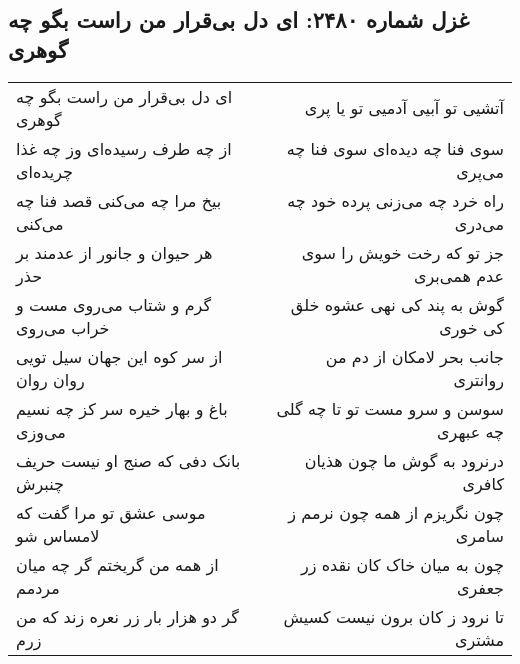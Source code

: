 \begin{center}
\section*{غزل شماره ۲۴۸۰: ای دل بی‌قرار من راست بگو چه گوهری}
\label{sec:2480}
\begin{longtable}{l p{0.5cm} r}
ای دل بی‌قرار من راست بگو چه گوهری
&&
آتشیی تو آبیی آدمیی تو یا پری
\\
از چه طرف رسیده‌ای وز چه غذا چریده‌ای
&&
سوی فنا چه دیده‌ای سوی فنا چه می‌پری
\\
بیخ مرا چه می‌کنی قصد فنا چه می‌کنی
&&
راه خرد چه می‌زنی پرده خود چه می‌دری
\\
هر حیوان و جانور از عدمند بر حذر
&&
جز تو که رخت خویش را سوی عدم همی‌بری
\\
گرم و شتاب می‌روی مست و خراب می‌روی
&&
گوش به پند کی نهی عشوه خلق کی خوری
\\
از سر کوه این جهان سیل تویی روان روان
&&
جانب بحر لامکان از دم من روانتری
\\
باغ و بهار خیره سر کز چه نسیم می‌وزی
&&
سوسن و سرو مست تو تا چه گلی چه عبهری
\\
بانک دفی که صنج او نیست حریف چنبرش
&&
درنرود به گوش ما چون هذیان کافری
\\
موسی عشق تو مرا گفت که لامساس شو
&&
چون نگریزم از همه چون نرمم ز سامری
\\
از همه من گریختم گر چه میان مردمم
&&
چون به میان خاک کان نقده زر جعفری
\\
گر دو هزار بار زر نعره زند که من زرم
&&
تا نرود ز کان برون نیست کسیش مشتری
\\
\end{longtable}
\end{center}
